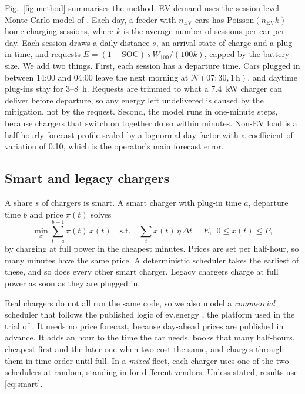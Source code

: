 \documentclass[conference]{IEEEtran}
\begin{document}
Fig.~\ref{fig:method} summarises the method. EV demand uses the
session-level Monte Carlo model of \cite{gupta2027}. Each
day, a feeder with $n_{\text{EV}}$ cars has $\mathrm{Poisson}(n_{\text{EV}}k)$
home-charging sessions, where $k$ is the average number of sessions per car
per day. Each session draws a daily distance $s$, an arrival state of charge
and a plug-in time, and requests $E = (1-\mathrm{SOC})\,s\,W_{100}/(100k)$,
capped by the battery size. We add two things. First, each session has a
departure time. Cars plugged in between 14:00 and 04:00 leave
the next morning at $\mathcal{N}(07{:}30,1\,\text{h})$, and daytime plug-ins
stay for 3--8~h. Requests are trimmed to what a 7.4~kW charger can deliver
before departure, so any energy left undelivered is caused by the mitigation,
not by the request. Second, the model runs in one-minute steps, because
chargers that switch on together do so within minutes. Non-EV load is a
half-hourly forecast profile scaled by a lognormal day factor with a
coefficient of variation of 0.10, which is the operator's main forecast error.

\subsection{Smart and legacy chargers}

A share $s$ of chargers is smart. A smart charger with plug-in time $a$,
departure time $b$ and price $\pi(t)$ solves
\begin{equation}
\min_{x} \sum_{t=a}^{b-1} \pi(t)\,x(t) \quad \text{s.t.} \quad
\sum_t x(t)\,\eta\,\Delta t = E,\ \ 0 \le x(t) \le P,
\label{eq:smart}
\end{equation}
by charging at full power in the cheapest minutes. Prices are set per
half-hour, so many minutes have the same price. A deterministic scheduler
takes the earliest of these, and so does every other smart charger. Legacy
chargers charge at full power as soon as they are plugged in.

Real chargers do not all run the same code, so we also model a
\emph{commercial} scheduler that follows the published logic of ev.energy
\cite{evenergy}, the platform used in the trial of \cite{samende2025}. It
needs no price forecast, because day-ahead prices are published in advance.
It adds an hour to the time the car needs, books that many half-hours,
cheapest first and the later one when two cost the same, and charges through
them in time order until full. In a \emph{mixed} fleet, each charger uses
one of the two schedulers at random, standing in for different vendors.
Unless stated, results use \eqref{eq:smart}.
\end{document}
